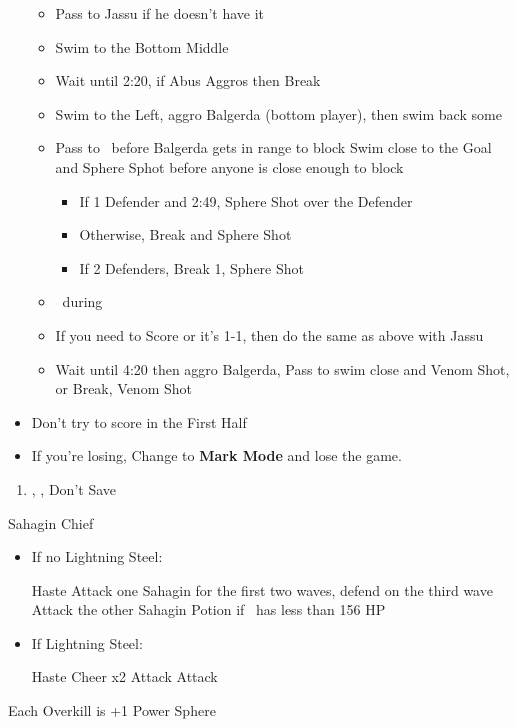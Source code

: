 \begin{trial}
\begin{itemize}
\begin{itemize}
    	\item Pass to Jassu if he doesn't have it
    	\item Swim to the Bottom Middle
    	\item Wait until 2:20, if Abus Aggros then Break
    	\item Swim to the Left, aggro Balgerda (bottom player), then swim back some
    	\item Pass to \tidus\ before Balgerda gets in range to block
    	\tidusf Swim close to the Goal and Sphere Sphot before anyone is close enough to block
    	\begin{itemize}
    		\item If 1 Defender and 2:49, Sphere Shot over the Defender
    		\item Otherwise, Break and Sphere Shot
    		\item If 2 Defenders, Break 1, Sphere Shot
	\end{itemize}
	\item \sd\ during \wakka\ \cs
	\item If you need to Score or it's 1-1, then do the same as above with Jassu
	\item Wait until 4:20 then aggro Balgerda, Pass to \wakka
	\wakkaf swim close and Venom Shot, or Break, Venom Shot
	\end{itemize}
  \item Don't try to score in the First Half
  \item If you're losing, Change to \textbf{Mark Mode} and lose the game.
  \end{itemize}
\end{trial}
\begin{enumerate}[resume]
  \item \sd, \cs[1:00], Don't Save
\end{enumerate}
\begin{battle}{Sahagin Chief}
  \begin{itemize}
    \item{If no Lightning Steel:}
          \begin{itemize}
            \tidusf Haste \tidus
            \wakkaf Attack one Sahagin for the first two waves, defend on the third wave
            \tidusf Attack the other Sahagin
            \wakkaf Potion if \tidus\ has less than 156 HP
          \end{itemize}
    \item{If Lightning Steel:}
          \begin{itemize}
            \tidusf Haste \tidus
            \tidusf Cheer x2
            \wakkaf Attack
            \tidusf Attack
          \end{itemize}
  \end{itemize}
Each Overkill is +1 Power Sphere
\end{battle}
